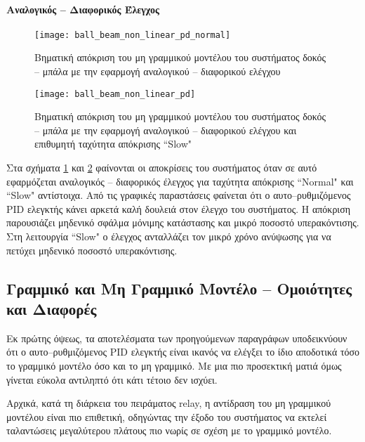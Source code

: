\paragraph{Αναλογικός -- Διαφορικός Έλεγχος}\hfill

\begin{figure}[H]
  \centering
  \texttt{[image: ball\_beam\_non\_linear\_pd\_normal]}
  \caption{Βηματική απόκριση του μη γραμμικού μοντέλου του συστήματος δοκός -- μπάλα με την εφαρμογή αναλογικού -- διαφορικού ελέγχου}
  \label{fig:ball_beam_non_linear_pd_normal}
\end{figure}

\begin{figure}[h]
  \centering
  \texttt{[image: ball\_beam\_non\_linear\_pd]}
  \caption{Βηματική απόκριση του μη γραμμικού μοντέλου του συστήματος δοκός -- μπάλα με την εφαρμογή αναλογικού -- διαφορικού ελέγχου και επιθυμητή ταχύτητα απόκρισης ``Slow"}
  \label{fig:ball_beam_non_linear_pd}
\end{figure}

Στα σχήματα \ref{fig:ball_beam_non_linear_pd_normal} και \ref{fig:ball_beam_non_linear_pd} φαίνονται οι αποκρίσεις του συστήματος όταν σε αυτό εφαρμόζεται αναλογικός -- διαφορικός έλεγχος για ταχύτητα απόκρισης ``Normal" και ``Slow" αντίστοιχα. Από τις γραφικές παραστάσεις φαίνεται ότι ο αυτο--ρυθμιζόμενος PID ελεγκτής κάνει αρκετά καλή δουλειά στον έλεγχο του συστήματος. Η απόκριση παρουσιάζει μηδενικό σφάλμα μόνιμης κατάστασης και μικρό ποσοστό υπερακόντισης. Στη λειτουργία ``Slow" ο έλεγχος ανταλλάζει τον μικρό χρόνο ανύψωσης για να πετύχει μηδενικό ποσοστό υπερακόντισης.

\subsection{Γραμμικό και Μη Γραμμικό Μοντέλο -- Ομοιότητες και Διαφορές}

Εκ πρώτης όψεως, τα αποτελέσματα των προηγούμενων παραγράφων υποδεικνύουν ότι ο αυτο--ρυθμιζόμενος PID ελεγκτής είναι ικανός να ελέγξει το ίδιο αποδοτικά τόσο το γραμμικό μοντέλο όσο και το μη γραμμικό. Με μια πιο προσεκτική ματιά όμως γίνεται εύκολα αντιληπτό ότι κάτι τέτοιο δεν ισχύει.

Αρχικά, κατά τη διάρκεια του πειράματος relay, η αντίδραση του μη γραμμικού μοντέλου είναι πιο επιθετική, οδηγώντας την έξοδο του συστήματος να εκτελεί ταλαντώσεις μεγαλύτερου πλάτους πιο νωρίς σε σχέση με το γραμμικό μοντέλο.

